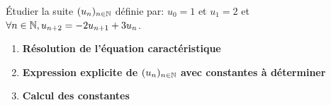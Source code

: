 \documentclass[a4paper, 11pt]{article}
\begin{document}
\begin{exemple}
\'Etudier la suite $(u_n)_{n\in \mathbb{N}}$ d\'efinie par: $u_0=1$ et $u_1=2$ et $\forall n\in\mathbb{N},  u_{n+2}=-2u_{n+1}+3u_n$.

\begin{enumerate}
\item \textbf{Résolution de l'équation caractéristique}
\vspace*{4cm}


\item \textbf{Expression explicite de $(u_n)_{n\in \mathbb{N}}$ avec constantes à déterminer }
\vspace*{3cm}

\item \textbf{Calcul des constantes}
\vspace*{7cm}

\end{enumerate}
\end{exemple}
\end{document}
